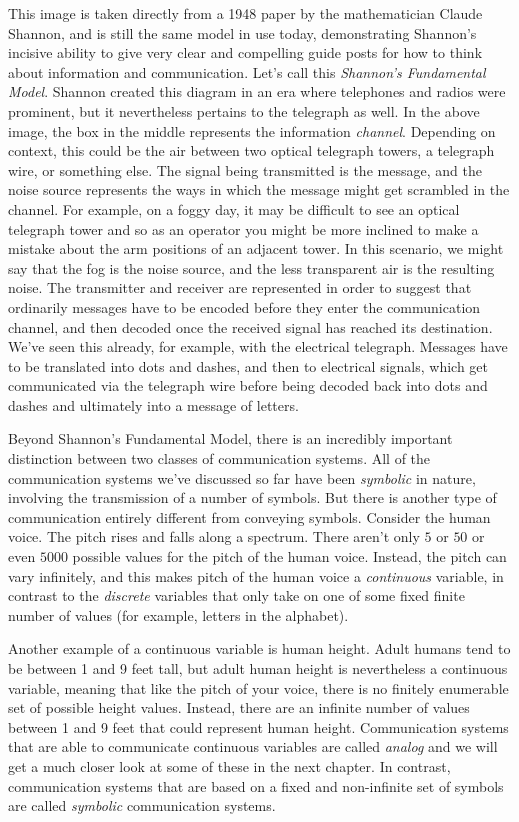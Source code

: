 \documentclass[UTF8]{book}
\begin{document}
\begin{CJK}{UTF8}{gbsn}
This image is taken directly from a 1948 paper by the mathematician Claude Shannon, and is still the same model in use today, demonstrating Shannon's incisive ability to give very clear and compelling guide posts for how to think about information and communication. Let's call this \emph{Shannon's Fundamental Model}. Shannon created this diagram in an era where telephones and radios were prominent, but it nevertheless pertains to the telegraph as well. In the above image, the box in the middle represents the information \emph{channel}. Depending on context, this could be the air between two optical telegraph towers, a telegraph wire, or something else. The signal being transmitted is the message, and the noise source represents the ways in which the message might get scrambled in the channel. For example, on a foggy day, it may be difficult to see an optical telegraph tower and so as an operator you might be more inclined to make a mistake about the arm positions of an adjacent tower. In this scenario, we might say that the fog is the noise source, and the less transparent air is the resulting noise. The transmitter and receiver are represented in order to suggest that ordinarily messages have to be encoded before they enter the communication channel, and then decoded once the received signal has reached its destination. We've seen this already, for example, with the electrical telegraph. Messages have to be translated into dots and dashes, and then to electrical signals, which get communicated via the telegraph wire before being decoded back into dots and dashes and ultimately into a message of letters.

Beyond Shannon's Fundamental Model, there is an incredibly important distinction between two classes of communication systems. All of the communication systems we've discussed so far have been \emph{symbolic} in nature, involving the transmission of a number of symbols. But there is another type of communication entirely different from conveying symbols. Consider the human voice. The pitch rises and falls along a spectrum. There aren't only $5$ or $50$ or even $5000$ possible values for the pitch of the human voice. Instead, the pitch can vary infinitely, and this makes pitch of the human voice a \emph{continuous} variable, in contrast to the \emph{discrete} variables that only take on one of some fixed finite number of values (for example, letters in the alphabet).

Another example of a continuous variable is human height. Adult humans tend to be between 1 and 9 feet tall, but adult human height is nevertheless a continuous variable, meaning that like the pitch of your voice, there is no finitely enumerable set of possible height values. Instead, there are an infinite number of values between 1 and 9 feet that could represent human height. Communication systems that are able to communicate continuous variables are called \emph{analog} and we will get a much closer look at some of these in the next chapter. In contrast, communication systems that are based on a fixed and non-infinite set of symbols are called \emph{symbolic} communication systems.


\end{CJK}
\end{document}
